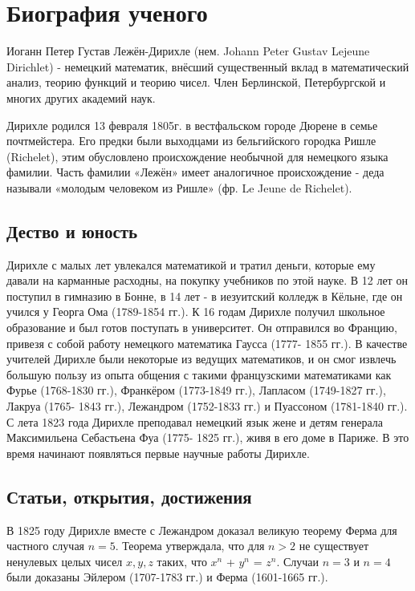 \chapter{Биография ученого}

Иоганн Петер Густав Лежён-Дирихле (нем. Johann Peter Gustav Lejeune Dirichlet) - немецкий математик, внёсший существенный вклад в математический анализ, теорию функций и теорию чисел. Член Берлинской, Петербургской и многих других академий наук.

Дирихле родился 13 февраля 1805г. в вестфальском городе Дюрене в семье почтмейстера. Его предки были выходцами из бельгийского городка Ришле (Richelet), этим обусловлено происхождение необычной для немецкого языка фамилии. Часть фамилии «Лежён» имеет аналогичное происхождение - деда называли «молодым человеком из Ришле» (фр. Le Jeune de Richelet).

\section{Дество и юность}

Дирихле с малых лет увлекался математикой и тратил деньги, которые ему давали на карманные расходны, на покупку учебников по этой науке. В 12 лет он поступил в гимназию в Бонне, в 14 лет - в иезуитский колледж в Кёльне, где он учился у Георга Ома (1789-1854 гг.). К 16 годам Дирихле получил школьное образование и был готов поступать в университет. Он отправился во Францию, привезя с собой работу немецкого математика Гаусса (1777- 1855 гг.). В качестве учителей Дирихле были некоторые из ведущих математиков, и он смог извлечь большую пользу из опыта общения с такими французскими математиками как Фурье (1768-1830 гг.), Франкёром (1773-1849 гг.), Лапласом (1749-1827 гг.), Лакруа (1765- 1843 гг.), Лежандром (1752-1833 гг.) и Пуассоном (1781-1840 гг.). С лета 1823 года Дирихле преподавал немецкий язык жене и детям генерала Максимильена Себастьена Фуа (1775- 1825 гг.), живя в его доме в Париже. В это время начинают появляться первые научные работы Дирихле.

\section{Статьи, открытия, достижения}

В 1825 году Дирихле вместе с Лежандром доказал великую теорему Ферма для частного случая $n = 5$. Теорема утверждала, что для $n > 2$ не существует ненулевых целых чисел $x,y,z$ таких, что $x^n$ + $y^n$ = $z^n$. Случаи $n = 3$ и $n = 4$ были доказаны Эйлером (1707-1783 гг.) и Ферма (1601-1665 гг.). 

